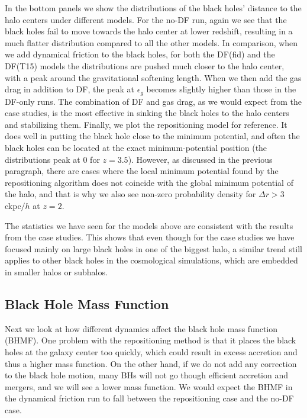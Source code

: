 In the bottom panels we show the distributions of the black holes' distance to the halo centers under different models. For the no-DF run, again we see that the black holes fail to move towards the halo center at lower redshift, resulting in a much flatter distribution compared to all the other models. In comparison, when we add dynamical friction to the black holes, for both the DF(fid) and the DF(T15) models the distributions are pushed much closer to the halo center, with a peak around the gravitational softening length. When we then add the gas drag in addition to DF, the peak at $\epsilon_g$ becomes slightly higher than those in the DF-only runs. The combination of DF and gas drag, as we would expect from the case studies, is the most effective in sinking the black holes to the halo centers and stabilizing them. Finally, we plot the repositioning model for reference.  It does well in putting the black hole close to the minimum potential, and often the black holes can be located at the exact minimum-potential position (the distributions peak at 0 for $z=3.5$). However, as discussed in the previous paragraph, there are cases where the local minimum potential found by the repositioning algorithm does not coincide with the global minimum potential of the halo, and that is why we also see non-zero probability density for $\Delta r > 3$ ckpc$/h$ at $z=2$.

The statistics we have seen for the models above are consistent with the results from the case studies. This shows that even though for the case studies we have focused mainly on large black holes in one of the biggest halo, a similar trend still applies to other black holes in the cosmological simulations, which are embedded in smaller halos or subhalos.


 


\subsection{Black Hole Mass Function}
\label{subsec:bhmf}
Next we look at how different dynamics affect the black hole mass function (BHMF). One problem with the repositioning method is that it places the black holes at the galaxy center too quickly, which could result in excess accretion and thus a higher mass function. On the other hand, if we do not add any correction to the black hole motion, many BHs will not go though efficient accretion and mergers, and we will see a lower mass function. We would expect the BHMF in the dynamical friction run to fall between the repositioning case and the no-DF case.

